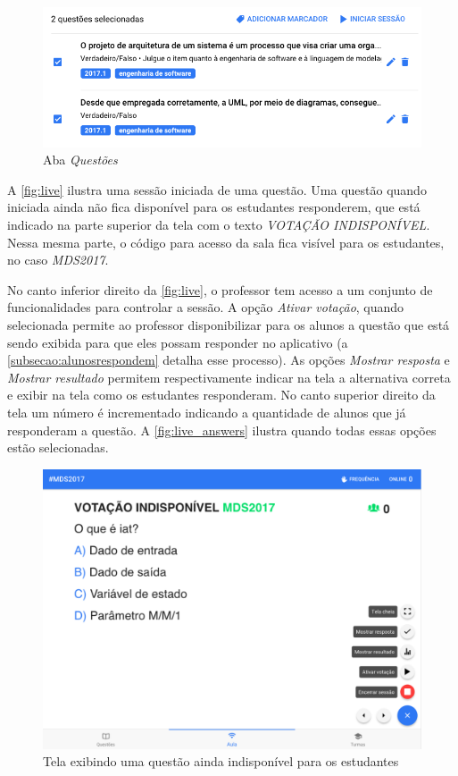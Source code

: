 \begin{figure}[ht]
  \centering
  \caption{Aba \textit{Questões}}
  \label{fig:session_details}
  \includegraphics[scale=.50]{imagens/telas/session_details}
  \doautor
\end{figure}

A \autoref{fig:live} ilustra uma sessão iniciada de uma questão. Uma questão quando
iniciada ainda não fica disponível para os estudantes responderem, que está indicado
na parte superior da tela com o texto \textit{VOTAÇÃO INDISPONÍVEL}. Nessa mesma parte,
o código para acesso da sala fica visível para os estudantes, no caso \textit{MDS2017}.

No canto inferior direito da \autoref{fig:live}, o professor tem acesso a um conjunto de
funcionalidades para controlar a sessão. A opção \textit{Ativar votação}, quando selecionada
permite ao professor disponibilizar para os alunos a questão que está sendo exibida para que
eles possam responder no aplicativo (a \autoref{subsecao:alunosrespondem} detalha esse processo).
As opções \textit{Mostrar resposta} e \textit{Mostrar resultado} permitem respectivamente indicar
na tela a alternativa correta e exibir na tela como os estudantes responderam.
No canto superior direito da tela um número é incrementado indicando a quantidade de
alunos que já responderam a questão. A \autoref{fig:live_answers} ilustra quando
todas essas opções estão selecionadas.

\begin{figure}[!ht]
  \centering
  \caption{Tela exibindo uma questão ainda indisponível para os estudantes}
  \label{fig:live}
  \includegraphics[scale=.35]{imagens/telas/live}
  \doautor
\end{figure}

